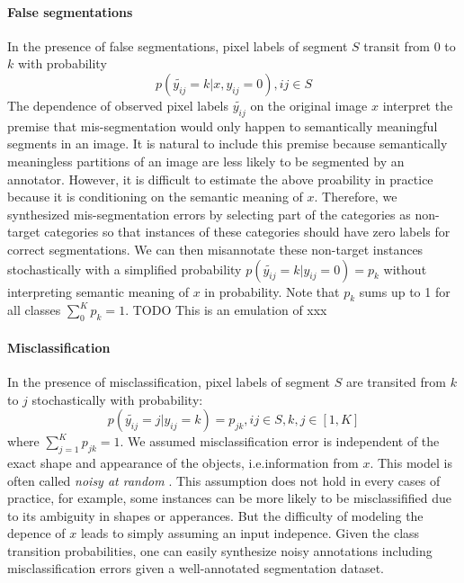 

\paragraph{False segmentations}

In the presence of false segmentations, pixel labels of segment $S$ transit from $0$ to $k$ with probability
$$p(\tilde{y_{ij}}=k \vert x, y_{ij}=0), ij \in S $$
The dependence of observed pixel labels $\tilde{y_{ij}}$ on the original image $x$ interpret the premise that mis-segmentation would only happen to semantically meaningful segments in an image.
It is natural to include this premise because semantically meaningless partitions of an image are less likely to be segmented by an annotator.
However, it is difficult to estimate the above proability in practice because it is conditioning on the semantic meaning of $x$.
Therefore, we synthesized mis-segmentation errors by selecting part of the categories as non-target categories so that instances of these categories should have zero labels for correct segmentations.
We can then misannotate these non-target instances stochastically with a simplified probability $p(\tilde{y_{ij}}=k \vert y_{ij}=0)=p_k$ without  interpreting semantic meaning of $x$ in probability.
Note that $p_k$ sums up to 1 for all classes $\sum_0^K p_k = 1$.
{TODO} This is an emulation of xxx

\paragraph{Misclassification}

In the presence of misclassification, pixel labels of segment $S$ are transited from $k$ to $j$ stochastically with probability:
$$p(\tilde{y_{ij}}=j \vert y_{ij}=k) = p_{jk}, ij \in S, k,j \in [1,K]$$
where $\sum_{j=1}^{K}p_{jk}=1$.
We assumed misclassification error is independent of the exact shape and appearance of the objects, i.e.information from $x$.
This model is often called \textit{noisy at random} \cite{frenay2014classification}.
This assumption does not hold in every cases of practice, for example, some instances can be more likely to be misclassifified due to its ambiguity in shapes or apperances.
But the difficulty of modeling the depence of $x$ leads to simply assuming an input indepence.
Given the class transition probabilities, one can easily synthesize noisy annotations including misclassification errors given a well-annotated segmentation dataset.

